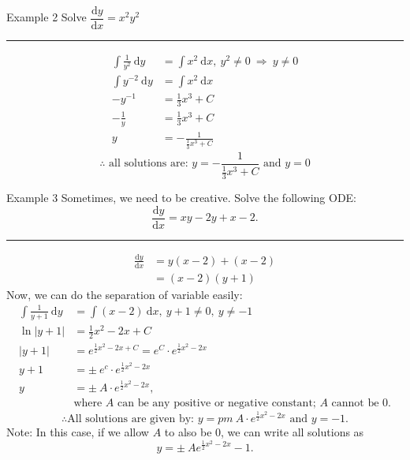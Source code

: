 \documentclass[12pt,a4paper]{article}
\def\d{{\mathrm{d}}}
\begin{document}
\begin{eg}{Example 2}
	Solve $\dfrac{\d y}{\d x}=x^2y^2$\\
	\noindent\rule[0.25\baselineskip]{\textwidth}{1pt}
	$$\begin{aligned}
		\int\frac{1}{y^2}\ \d y&=\int x^2\ \d x,\ y^2\neq 0\ \Rightarrow\ y\neq 0\\
		\int y^{-2}\ \d y&=\int x^2\ \d x\\
		-y^{-1}&=\frac{1}{3}x^3+C\\
		-\frac{1}{y}&=\frac{1}{3}x^3+C\\
		y&=-\frac{1}{\frac{1}{3}x^3+C}
	\end{aligned}$$
	$$\therefore\text{ all solutions are: }y=-\frac{1}{\frac{1}{3}x^3+C}\text{ and }y=0$$
\end{eg}
\begin{eg}{Example 3}
	Sometimes, we need to be creative. 
	Solve the following ODE: 
	$$\dfrac{\d y}{\d x}=xy-2y+x-2.$$
	\noindent\rule[0.25\baselineskip]{\textwidth}{1pt}
	$$\begin{aligned}
		\frac{\d y}{\d x}&=y(x-2)+(x-2)\\
		&=(x-2)(y+1)
	\end{aligned}$$
	Now, we can do the separation of variable easily: 
	$$\begin{aligned}
		\int\frac{1}{y+1}\ \d y&=\int(x-2)\ \d x,\ y+1\neq 0,\ y\neq-1\\
		\ln|y+1|&=\frac{1}{2}x^2-2x+C\\
		|y+1|&=e^{\frac{1}{2}x^2-2x+C}=e^{C}\cdot e^{\frac{1}{2}x^2-2x}\\
		y+1&=\pm\ e^{c}\cdot e^{\frac{1}{2}x^2-2x}\\
		y&=\pm\ A\cdot e^{\frac{1}{2}x^2-2x}, \\
		&\text{where }A\text{ can be any positive or negative constant; }A\text{ cannot be }0.
	\end{aligned}$$
	$$\therefore \text{All solutions are given by: }y=pm\ A\cdot e^{\frac{1}{2}x^2-2x}\text{ and }y=-1.$$
	Note: In this case, if we allow $A$ to also be $0$, we can write all solutions as $$y=\pm\ Ae^{\frac{1}{2}x^2-2x}-1.$$
\end{eg}
\end{document}
